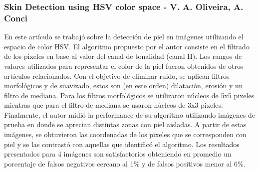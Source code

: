 	
	
	
	\subsubsection{Skin Detection using HSV color space - V. A. Oliveira, A. Conci}
	En este art\'iculo se trabaj\'o sobre la detecci\'on de piel en im\'agenes utilizando el espacio de color HSV. El algoritmo propuesto 
por el autor consiste en el filtrado de los pixeles en base al valor del canal de tonalidad (canal H). Los rangos de valores utilizados para 
representar el color de la piel fueron obtenidos de otros art\'iculos 
relacionados. Con el objetivo de eliminar ruido, se aplican filtros morfol\'ogicos y de suavizado, estos son (en este orden) dilataci\'on, erosi\'on y un filtro de mediana. Para los filtros morfol\'ogicos se utilizaron n\'ucleos de 5x5 pixeles mientras que para el filtro de mediana se usaron n\'ucleos de 3x3 pixeles. Finalmente, el autor midi\'o la performance de su algoritmo utilizando im\'agenes de prueba en donde se aprecian distintas zonas con piel aisladas. A partir de estas im\'agenes, se obtuvieron las coordenadas de los pixeles que se corresponden con piel y se las contrast\'o con aquellas que identific\'o el algoritmo. Los resultados presentados para 4 im\'agenes son satisfactorios obteniendo en promedio un porcentaje de falsos negativos cercano al 1\% y de falsos positivos menor al 6\%.

